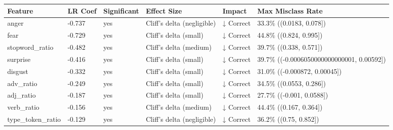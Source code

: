 \begin{tabular}{llllll}
\toprule
Feature & LR Coef & Significant & Effect Size & Impact & Max Misclass Rate \\
\midrule
anger & -0.737 & yes & Cliff's delta (negligible) & ↓ Correct & 33.3\% ((0.0183, 0.078]) \\
fear & -0.729 & yes & Cliff's delta (small) & ↓ Correct & 44.8\% ((0.824, 0.995]) \\
stopword\_ratio & -0.482 & yes & Cliff's delta (medium) & ↓ Correct & 39.7\% ((0.338, 0.571]) \\
surprise & -0.416 & yes & Cliff's delta (small) & ↓ Correct & 39.7\% ((-0.0006050000000000001, 0.00592]) \\
disgust & -0.332 & yes & Cliff's delta (small) & ↓ Correct & 31.0\% ((-0.000872, 0.00045]) \\
adv\_ratio & -0.249 & yes & Cliff's delta (small) & ↓ Correct & 34.5\% ((0.0553, 0.286]) \\
adj\_ratio & -0.187 & yes & Cliff's delta (small) & ↓ Correct & 27.7\% ((-0.001, 0.0588]) \\
verb\_ratio & -0.156 & yes & Cliff's delta (medium) & ↓ Correct & 44.4\% ((0.167, 0.364]) \\
type\_token\_ratio & -0.129 & yes & Cliff's delta (negligible) & ↓ Correct & 36.2\% ((0.75, 0.852]) \\
\bottomrule
\end{tabular}
